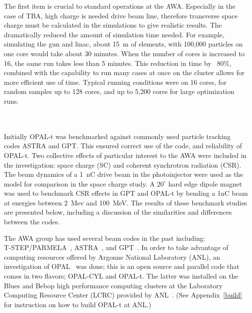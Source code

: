 The first item is crucial to standard operations at the AWA. Especially in the 
case of TBA,  high charge is needed  drive beam line, therefore transverse 
space charge must be calculated in the simulations to give realistic results. 
The  dramatically reduced the amount of simulation time needed. 
For example, simulating the gun and linac, about \SI{15}{m} of elements,
with 100,000 particles on one core would take about 30 minutes. 
When the number of cores is increased to 16, the same run takes less than 
5 minutes. This reduction in time by ~80\%, combined with the capability to run 
many cases at once on the cluster allows for more efficient use of time.
Typical running conditions were on 16 cores, for random samples up to 128 cores, 
and up to 5,200 cores for large optimization runs.\\
\\
\\  


\label{sec:bench}

Initially OPAL-t was benchmarked against commonly used particle tracking codes ASTRA and GPT.  
This ensured correct use of the code, and reliability of \mbox{OPAL-t}.  
Two collective effects of particular interest to the AWA were included in the investigation: 
space charge (SC) and coherent synchrotron radiation (CSR).
The beam dynamics of a \SI{1}{nC} drive beam in the photoinjector were used as 
the model for comparison in the space charge study. 
A $20^{\circ}$ hard edge dipole magnet was used to benchmark CSR effects in GPT and OPAL-t by bending a 1nC beam 
at energies between \SI{2}{Mev} and \SI{100}{MeV}.  
The results of these benchmark studies are presented below, 
including a discussion of the similarities and differences between the codes.
 
The AWA group has used several beam codes in the past including:\\
\mbox{T-STEP/PARMELA}~\cite{parmela}, ASTRA~\cite{astra}, and GPT~\cite{gpt}.  
In order to take advantage of computing resources offered by 
Argonne National Laboratory (ANL), an investigation of 
OPAL~\cite{opal} was done; this is an open source and parallel code that comes in two flavors;  
OPAL-CYL and OPAL-t. The latter was installed on the Blues and Bebop high performance computing clusters
at the Laboratory Computing Resource Center (LCRC) provided by ANL~\cite{lcrc}.
(See Appendix~\ref{build} for instruction on how to build OPAL-t at ANL.)

